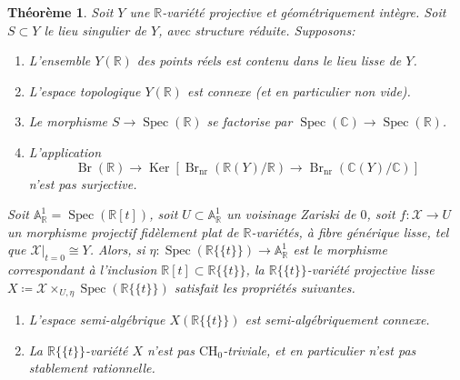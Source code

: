 \documentclass[11pt]{article}
\newenvironment{enumeratei}
{\bgroup\def\theenumi{\roman{enumi}}\def\theenumii{\arabic{enumii}}\begin{enumerate}}
{\end{enumerate}\egroup}
\newenvironment{enumeratea}
{\bgroup\def\theenumi{\alph{enumi}}\begin{enumerate}}
{\end{enumerate}\egroup}
\newcommand{\CH}{\mathrm{CH}}
\newtheorem{thm}{Théorème}[section]
\theoremstyle{definition}
\newcommand{\C}{\mathbb C}
\newcommand{\R}{\mathbb R}
\newcommand{\A}{\mathbb A}
\newcommand{\Spec}{\operatorname{Spec}}
\newcommand{\Br}{\operatorname{Br}}
\newcommand{\Ker}{\operatorname{Ker}}
\newcommand{\mc}[1]{\mathcal{#1}}
\newcommand{\on}[1]{\operatorname{#1}}
\newcommand{\puiseux}{\mathbb{R}\{\!\{t\}\!\}}
\begin{document}
\begin{thm}\label{generateur}
Soit $Y$ une $\R$-variété projective et géométriquement intègre. Soit $S\subset Y$ le lieu singulier de $Y$, avec structure réduite. Supposons:
\begin{enumeratea}
\item\label{generateura}
L'ensemble $Y(\R)$ des points réels est contenu dans le lieu lisse de $Y$.
\item\label{generateurb}
L'espace topologique $Y(\R)$ est connexe (et en particulier non vide).
\item\label{generateurc}
Le morphisme $S\to \on{Spec}(\R)$ se factorise par $\Spec(\C)\to\Spec(\R)$.
\item\label{generateurd}
L'application
\[\Br(\R) \to \Ker [\Br_{\on{nr}}(\R(Y)/\R) \to \Br_{\on{nr}}(\C(Y)/\C)]\] n'est pas
surjective.
\end{enumeratea}

Soit $\A^1_\R=\Spec( \R[t])$, soit $U\subset \A^1_\R$ un voisinage Zariski de $0$, soit $f\colon \mc{X}\to U$ un morphisme projectif fidèlement plat de $\R$-variétés, à fibre générique lisse, tel que $\mc{X}|_{t=0}\cong Y$. Alors, si $\eta\colon \Spec(\puiseux)\to \A^1_\R$ est le morphisme correspondant à l'inclusion $\R[t]\subset \puiseux$, la $\puiseux$-variété projective lisse $X\coloneqq \mc{X}\times_{U,\eta}\Spec(\puiseux)$ satisfait les propriétés suivantes.

\begin{enumeratei}
\item\label{generateuri}
L'espace semi-algébrique $X(\puiseux)$ est semi-algébriquement connexe.
\item\label{generateurii}
La $\puiseux$-variété $X$ n'est pas $\CH_0$-triviale, et en particulier
n'est pas stablement rationnelle.
\end{enumeratei}
\end{thm}
\end{document}
